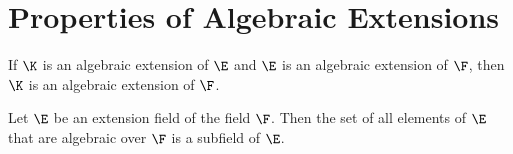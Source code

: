 \section{Properties of Algebraic Extensions}

\begin{theorem}
	If $\K$ is an algebraic extension of $\E$ and $\E$ is an algebraic extension of $\F$, then $\K$ is an algebraic extension of $\F$.
\end{theorem}

\begin{corollary}
	Let $\E$ be an extension field of the field $\F$. Then the set of all elements of $\E$ that are algebraic over $\F$ is a subfield of $\E$.
\end{corollary}
